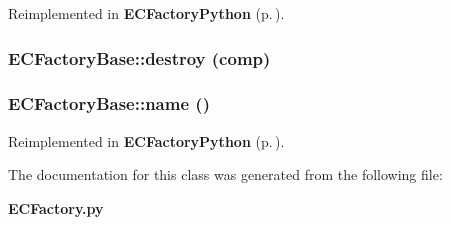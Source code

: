 Reimplemented in {\bf ECFactory\-Python} {\rm (p.\,\pageref{classECFactoryPython_ECFactoryPythona3})}.
\subsubsection{\setlength{\rightskip}{0pt plus 5cm}ECFactory\-Base::destroy (comp)}\label{classECFactoryBase_ECFactoryPythona6}


\subsubsection{\setlength{\rightskip}{0pt plus 5cm}ECFactory\-Base::name ()}\label{classECFactoryBase_ECFactoryBasea1}




Reimplemented in {\bf ECFactory\-Python} {\rm (p.\,\pageref{classECFactoryPython_ECFactoryPythona2})}.

The documentation for this class was generated from the following file:\begin{CompactItemize}
\item 
{\bf ECFactory.py}\end{CompactItemize}
